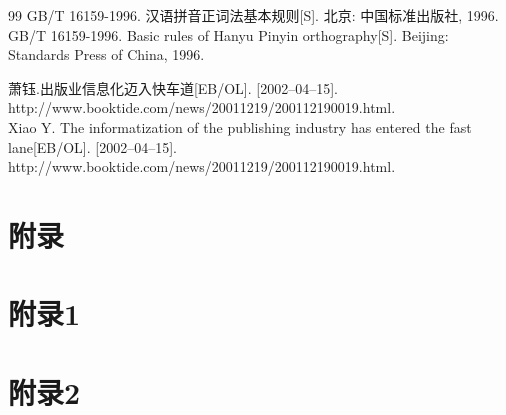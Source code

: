 \documentclass{setp-new}
\begin{document}
\begin{thebibliography}{99}
%
%
 GB/T 16159-1996. 汉语拼音正词法基本规则[S]. 北京: 中国标准出版社, 1996.
GB/T 16159-1996. Basic rules of Hanyu Pinyin orthography[S]. Beijing: Standards Press of China, 1996.


%
%
萧钰.出版业信息化迈入快车道[EB/OL]. [2002--04--15].\\
http://www.booktide.com/news/20011219/200112190019.html.\\
Xiao Y. The informatization of the publishing industry has entered the fast lane[EB/OL]. [2002--04--15].
http://www.booktide.com/news/20011219/200112190019.html.\\


\end{thebibliography}



\clearpage
 
\appendix



\section*{附录}

\setcounter{page}{1}

\section{附录1}







\newpage%


  \section{附录2}
\end{document}
